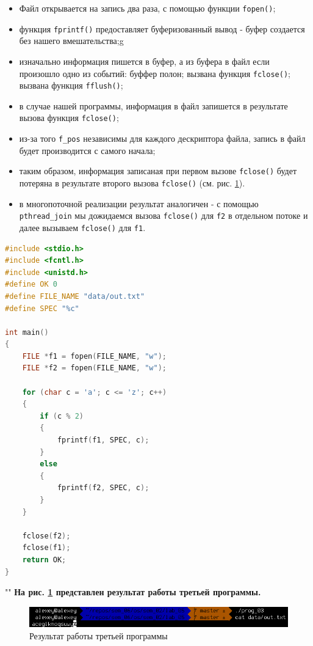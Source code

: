 \documentclass[12pt]{report}
\begin{document}
\begin{itemize}
	\item Файл открывается на запись два раза, с помощью функции \texttt{fopen()};
	\item функция \texttt{fprintf()} предоставляет буферизованный вывод - буфер создается без нашего вмешательства;g
	\item изначально информация пишется в буфер, а из буфера в файл если произошло одно из событий:
		\subitem буффер полон;
		\subitem вызвана функция \texttt{fclose()};
		\subitem вызвана функция \texttt{fflush()};
	\item в случае нашей программы, информация в файл запишется в результате вызова функция \texttt{fclose()};
	\item из-за того \texttt{f\_pos} независимы для каждого дескриптора файла, запись в файл будет производится с самого начала;
	\item таким образом, информация записаная при первом вызове \texttt{fclose()} будет потеряна в результате второго вызова \texttt{fclose()} (см. рис. \ref{fig:prog_03}).
	\item в многопоточной реализации результат аналогичен - с помощью \texttt{pthread\_join} мы дожидаемся вызова \texttt{fclose()} для \texttt{f2} в отдельном потоке и далее вызываем \texttt{fclose()} для \texttt{f1}.
\end{itemize}

\begin{lstlisting}[language=c, label=p3, caption=Программа №3]
#include <stdio.h>
#include <fcntl.h>
#include <unistd.h>
#define OK 0
#define FILE_NAME "data/out.txt"
#define SPEC "%c"

int main()
{
	FILE *f1 = fopen(FILE_NAME, "w");
	FILE *f2 = fopen(FILE_NAME, "w");
	
	for (char c = 'a'; c <= 'z'; c++)
	{
		if (c % 2)
		{
			fprintf(f1, SPEC, c);
		}
		else
		{
			fprintf(f2, SPEC, c);
		}
	}
	
	fclose(f2);
	fclose(f1);
	return OK;
}
\end{lstlisting}

""\newline
\textbf{На рис. \ref{fig:prog_03} представлен результат работы третьей программы.}

\begin{figure}[H]
	\centering
	\includegraphics[scale=0.8]{img/prog_03.png}
	\caption{Результат работы третьей программы}
	\label{fig:prog_03}
\end{figure}
\end{document}
